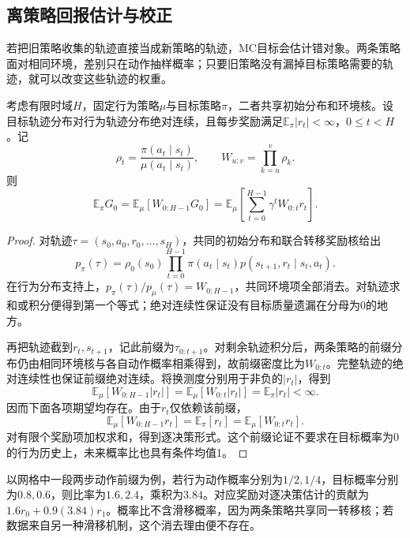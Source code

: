 \subsection{离策略回报估计与校正}
\label{sec:rl-learning-off-policy}

若把旧策略收集的轨迹直接当成新策略的轨迹，MC目标会估计错对象。两条策略面对相同环境，差别只在动作抽样概率；只要旧策略没有漏掉目标策略需要的轨迹，就可以改变这些轨迹的权重。

\begin{theorem}[轨迹与逐决策重要性校正]
  \label{thm:rl-learning-importance-sampling}
  考虑有限时域$H$，固定行为策略$\mu$与目标策略$\pi$，二者共享初始分布和环境核。设目标轨迹分布对行为轨迹分布绝对连续，且每步奖励满足$\mathbb E_\pi|r_t|<\infty$，$0\leq t<H$。记
  \[
    \rho_t=\frac{\pi(a_t\mid s_t)}{\mu(a_t\mid s_t)},\qquad
    W_{u:v}=\prod_{k=u}^{v}\rho_k .
  \]
  则
  \begin{equation}
    \mathbb E_\pi G_0
       =\mathbb E_\mu[W_{0:H-1}G_0]
       =\mathbb E_\mu\left[\sum_{t=0}^{H-1}
                           \gamma^t W_{0:t}r_t\right].
    \label{eq:rl-learning-is}
  \end{equation}
\end{theorem}
\begin{proof}
  对轨迹$\tau=(s_0,a_0,r_0,\ldots,s_H)$，共同的初始分布和联合转移奖励核给出
  \[
    p_\pi(\tau)=\rho_0(s_0)\prod_{t=0}^{H-1}
         \pi(a_t\mid s_t)p(s_{t+1},r_t\mid s_t,a_t).
  \]
  在行为分布支持上，$p_\pi(\tau)/p_\mu(\tau)=W_{0:H-1}$，共同环境项全部消去。对轨迹求和或积分便得到第一个等式；绝对连续性保证没有目标质量遗漏在分母为0的地方。

  再把轨迹截到$r_t,s_{t+1}$，记此前缀为$\tau_{0:t+1}$。对剩余轨迹积分后，两条策略的前缀分布仍由相同环境核与各自动作概率相乘得到，故前缀密度比为$W_{0:t}$。完整轨迹的绝对连续性也保证前缀绝对连续。将换测度分别用于非负的$|r_t|$，得到
  \[
    \mathbb E_\mu[W_{0:H-1}|r_t|]
    =\mathbb E_\mu[W_{0:t}|r_t|]
    =\mathbb E_\pi|r_t|<\infty.
  \]
  因而下面各项期望均存在。由于$r_t$仅依赖该前缀，
  \[
    \mathbb E_\mu[W_{0:H-1}r_t]
    =\mathbb E_\pi[r_t]
    =\mathbb E_\mu[W_{0:t}r_t].
  \]
  对有限个奖励项加权求和，得到逐决策形式。这个前缀论证不要求在目标概率为0的行为历史上，未来概率比也具有条件均值1。
\end{proof}

以网格中一段两步动作前缀为例，若行为动作概率分别为$1/2,1/4$，目标概率分别为$0.8,0.6$，则比率为$1.6,2.4$，乘积为$3.84$。对应奖励对逐决策估计的贡献为$1.6r_0+0.9(3.84)r_1$。概率比不含滑移概率，因为两条策略共享同一转移核；若数据来自另一种滑移机制，这个消去理由便不存在。

